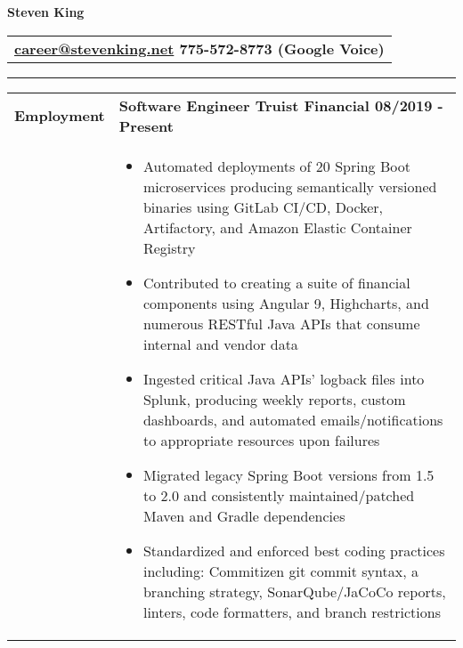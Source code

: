 \documentclass[final]{letter}
\begin{document}
	\begin{center}
		{\fontsize{36}{43.2}\selectfont\bf{Steven King}} \hspace{.18cm} {
			\begin{tabular}{c}\large\bf{\href{mailto:career@stevenking.net}{career@stevenking.net} \hspace{.2cm} 775-572-8773 (Google Voice)} \end{tabular}}
		
		\rule{.99\textwidth}{1pt}	

		\begin{tabularx}{\linewidth}{>{\raggedright\bf\Large{}}p{10.75em}X} Employment 
			& \large\bf{Software Engineer \hfill {Truist Financial} \hfill 08/2019 - Present} \\
			& \begin{itemize}[noitemsep,topsep=0pt]\setlength\itemsep{2px}
				\item Automated deployments of 20 Spring Boot microservices producing semantically versioned binaries using GitLab CI/CD, Docker, Artifactory, and Amazon Elastic Container Registry
				\item Contributed to creating a suite of financial components using Angular 9, Highcharts, and numerous RESTful Java APIs that consume internal and vendor data
				\item Ingested critical Java APIs' logback files into Splunk, producing weekly reports, custom dashboards, and automated emails/notifications to appropriate resources upon failures
				\item Migrated legacy Spring Boot versions from 1.5 to 2.0 and consistently maintained/patched Maven and Gradle dependencies
				\item Standardized and enforced best coding practices including: Commitizen git commit syntax, a branching strategy, SonarQube/JaCoCo reports, linters, code formatters, and branch restrictions
			\end{itemize} \\
		

\end{tabularx}
\end{center}
\end{document}
